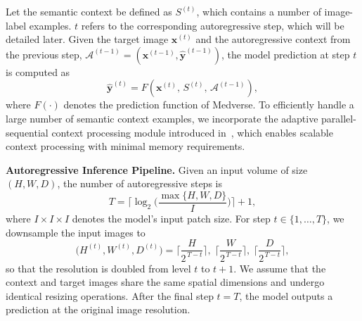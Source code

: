 Let the semantic context be defined as $S^{(t)}$, which contains a number of image-label examples. $t$ refers to the corresponding autoregressive step, which will be detailed later. Given the target image $\bm{x}^{(t)}$ and the autoregressive context from the previous step, $\mathcal{A}^{(t-1)} = (\bm{x}^{(t-1)}, \hat{\bm{y}}^{(t-1)})$, the model prediction at step $t$ is computed as
\begin{equation}
\hat{\bm{y}}^{(t)} = F(\bm{x}^{(t)},\, S^{(t)},\, \mathcal{A}^{(t-1)}),
\end{equation}
where $F(\cdot)$ denotes the prediction function of Medverse. To efficiently handle a large number of semantic context examples, we incorporate the adaptive parallel-sequential context processing module introduced in~\cite{hu2025building}, which enables scalable context processing with minimal memory requirements.

\vspace{0.4em}
\noindent\textbf{Autoregressive Inference Pipeline.}  
Given an input volume of size $(H,W,D)$, the number of autoregressive steps is
\begin{equation}
T=\bigl\lceil\log_{2}\bigl(\frac{\max\{H,W,D\}}{I}\bigr)\bigr\rceil+1,
\end{equation}
where $I\times I\times I$ denotes the model’s input patch size.
For step $t\in\{1,\dots,T\}$, we downsample the input images to
\begin{equation}
\bigl(H^{(t)},W^{(t)},D^{(t)}\bigr)=\bigl\lceil \frac{H}{2^{\,T-t}}\bigr\rceil,\;
\bigl\lceil \frac{W}{2^{\,T-t}}\bigr\rceil,\;
\bigl\lceil \frac{D}{2^{\,T-t}}\bigr\rceil,
\end{equation}
so that the resolution is doubled from level $t$ to $t+1$. We assume that the context and target images share the same spatial dimensions and undergo identical resizing operations. After the final step $t=T$, the model outputs a prediction at the original image resolution.

